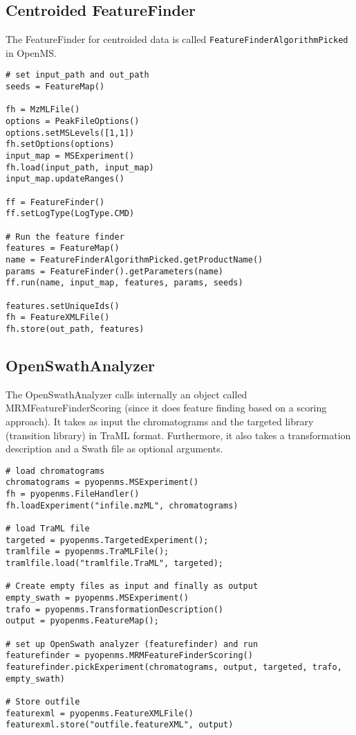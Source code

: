 \documentclass[10pt]{article}
\begin{document}
\subsection{Centroided FeatureFinder}

The FeatureFinder for centroided data is called
\texttt{FeatureFinderAlgorithmPicked} in OpenMS.

\begin{verbatim}
# set input_path and out_path
seeds = FeatureMap()

fh = MzMLFile()
options = PeakFileOptions()
options.setMSLevels([1,1])
fh.setOptions(options)
input_map = MSExperiment()
fh.load(input_path, input_map)
input_map.updateRanges()

ff = FeatureFinder()
ff.setLogType(LogType.CMD)

# Run the feature finder
features = FeatureMap()
name = FeatureFinderAlgorithmPicked.getProductName()
params = FeatureFinder().getParameters(name)
ff.run(name, input_map, features, params, seeds)

features.setUniqueIds()
fh = FeatureXMLFile()
fh.store(out_path, features)
\end{verbatim}

\subsection{OpenSwathAnalyzer}

The OpenSwathAnalyzer calls internally an object called
MRMFeatureFinderScoring (since it does feature finding based on a scoring
approach). It takes as input the chromatograms and the targeted library
(transition library) in TraML format. Furthermore, it also takes a
transformation description and a Swath file as optional arguments.

\begin{verbatim}
# load chromatograms
chromatograms = pyopenms.MSExperiment()
fh = pyopenms.FileHandler()
fh.loadExperiment("infile.mzML", chromatograms)

# load TraML file
targeted = pyopenms.TargetedExperiment();
tramlfile = pyopenms.TraMLFile();
tramlfile.load("tramlfile.TraML", targeted);

# Create empty files as input and finally as output
empty_swath = pyopenms.MSExperiment()
trafo = pyopenms.TransformationDescription()
output = pyopenms.FeatureMap();

# set up OpenSwath analyzer (featurefinder) and run
featurefinder = pyopenms.MRMFeatureFinderScoring()
featurefinder.pickExperiment(chromatograms, output, targeted, trafo, empty_swath)

# Store outfile
featurexml = pyopenms.FeatureXMLFile()
featurexml.store("outfile.featureXML", output)
\end{verbatim}
\end{document}
